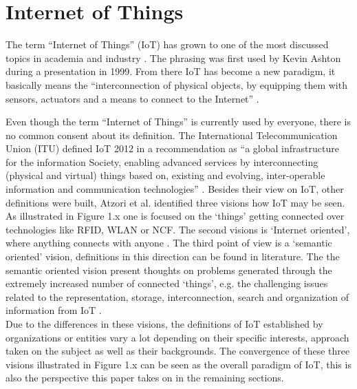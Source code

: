 \section{Internet of Things}
	The term ``Internet of Things'' (IoT) has grown to one of the most discussed topics in academia and industry \cite{ju}. The phrasing was first used by Kevin Ashton during a presentation in 1999. From there IoT has become a new paradigm, it basically means the ``interconnection of physical objects, by equipping them with sensors, actuators and a means to connect to the Internet'' \cite{dijkman}.

	Even though the term ``Internet of Things'' is currently used by everyone, there is no common consent about its definition. The International Telecommunication Union (ITU) defined IoT 2012 in a recommendation as ``a global infrastructure for the information Society, enabling advanced services by interconnecting (physical and virtual) things based on, existing and evolving, inter-operable information and communication technologies'' \cite{itu}. Besides their view on IoT, other definitions were built, Atzori et al. identified three visions how IoT may be seen. As illustrated in Figure 1.x one is focused on the `things' getting connected over technologies like RFID, WLAN or NCF. The second visions is `Internet oriented', where anything connects with anyone . The third point of view is a `semantic oriented' vision, definitions in this direction can be found in literature. The the semantic oriented vision present thoughts on problems generated through the extremely increased number of connected `things', e.g. the challenging issues related to the representation, storage, interconnection, search and organization of information from IoT \cite{atzori}.\\
	Due to the differences in these visions, the definitions of IoT established by organizations or entities vary a lot depending on their specific interests, approach taken on the subject as well as their backgrounds. The convergence of these three visions illustrated in Figure 1.x can be seen as the overall paradigm of IoT, this is also the perspective this paper takes  on in the remaining sections. 
